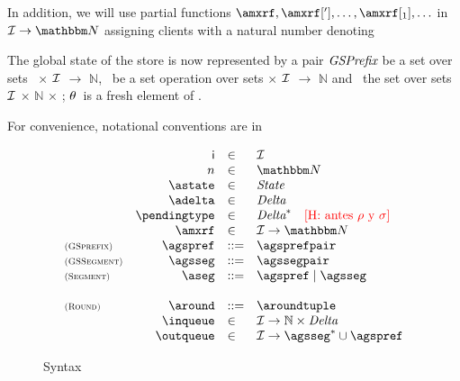 \documentclass[envcountsect,runningheads,orivec]{llncs}
\begin{document}
In addition,  we will use partial functions  $\amxrf,\amxrf['],\ldots, \amxrf[{_1}],\ldots$ in  $\idset\rightarrow \nat$
assigning clients with a natural number denoting 


The global state of the store is now represented by a pair $\textit{GSPrefix}$ be a set over sets \statetype\ $\times$ $\mathcal{\mathcal{I}}$ $\rightarrow$ $\mathbb{N}$, \gssegmenttype\ be a set operation over sets \deltatype $\times$ $\mathcal{\mathcal{I}}$ $\rightarrow$ $\mathbb{N}$ and \roundtype\ the set over sets $\mathcal{\mathcal{I}}$ $\times$ $\mathbb{N}$ $\times$ \deltatype; $\theta$\ is a fresh element of \gssegmenttype.
%

For convenience, notational conventions are in~\figref{}
\begin{figure}
  \[
   \begin{array}{lrll}
       & \cid & \in & \idset
       \\
       & n & \in & \nat
       \\
       &\astate & \in & \statetype
       \\
       &\adelta & \in & \deltatype
       \\
       &\pendingtype & \in & \deltatype^* \quad \mbox{\henote{antes $\rho$ y $\sigma$}}\\
       &\amxrf & \in & \idset\rightarrow \nat
       \\
       \rName{GSprefix}
       &
       \agspref & ::= & \agsprefpair
       \\
       \rName{GSSegment}
       &
       \agsseg & ::= & \agssegpair
       \\
       \rName{Segment}
       &
       \aseg & ::= & \agspref \; |\;  \agsseg
        \\
        \\
       \rName{Round}
       &
       \around &::= & \aroundtuple
       \\
       &
       {\inqueue} & \in  & \partialfunction{\idset}{\dominserver}
       \\
       & 
       \outqueue &\in & \partialfunction{\idset}{{\agsseg}^* \cup \agspref}
   \end{array}
  \]
  \caption{Syntax}
  \label{fig:syntax-implementation}
\end{figure}
\end{document}
